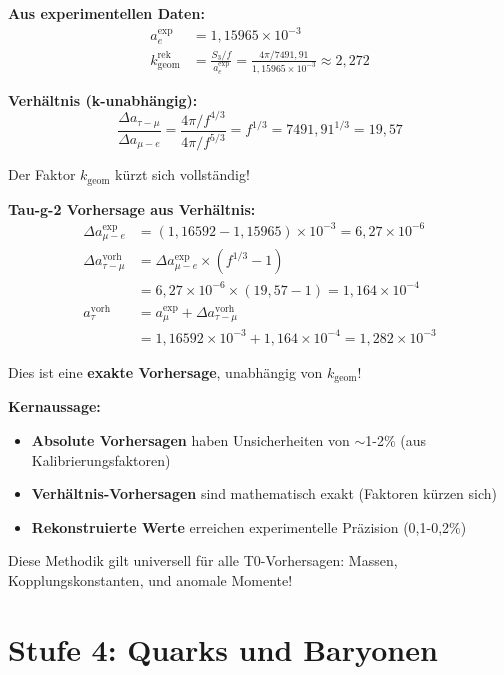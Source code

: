 	\textbf{Aus experimentellen Daten:}
	\begin{align}
		a_e^{\exp} &= 1{,}15965 \times 10^{-3} \\
		k_{\text{geom}}^{\text{rek}} &= \frac{S_3/f}{a_e^{\exp}} = \frac{4\pi/7491{,}91}{1{,}15965 \times 10^{-3}} \approx 2{,}272
	\end{align}
	
	\textbf{Verhältnis (k-unabhängig):}
	\begin{equation}
		\boxed{\frac{\Delta a_{\tau-\mu}}{\Delta a_{\mu-e}} = \frac{4\pi/f^{4/3}}{4\pi/f^{5/3}} = f^{1/3} = 7491{,}91^{1/3} = 19{,}57}
	\end{equation}
	
	Der Faktor \(k_{\text{geom}}\) kürzt sich vollständig!
	
	\textbf{Tau-g-2 Vorhersage aus Verhältnis:}
	\begin{align}
		\Delta a_{\mu-e}^{\exp} &= (1{,}16592 - 1{,}15965) \times 10^{-3} = 6{,}27 \times 10^{-6} \\
		\Delta a_{\tau-\mu}^{\text{vorh}} &= \Delta a_{\mu-e}^{\exp} \times (f^{1/3} - 1) \\
		&= 6{,}27 \times 10^{-6} \times (19{,}57 - 1) = 1{,}164 \times 10^{-4} \\
		a_\tau^{\text{vorh}} &= a_\mu^{\exp} + \Delta a_{\tau-\mu}^{\text{vorh}} \\
		&= 1{,}16592 \times 10^{-3} + 1{,}164 \times 10^{-4} = 1{,}282 \times 10^{-3}
	\end{align}
	
	Dies ist eine \textbf{exakte Vorhersage}, unabhängig von \(k_{\text{geom}}\)!
	
	\textbf{Kernaussage:}
	
	\begin{itemize}
		\item \textbf{Absolute Vorhersagen} haben Unsicherheiten von \(\sim\)1-2\% (aus Kalibrierungsfaktoren)
		\item \textbf{Verhältnis-Vorhersagen} sind mathematisch exakt (Faktoren kürzen sich)
		\item \textbf{Rekonstruierte Werte} erreichen experimentelle Präzision (0{,}1-0{,}2\%)
	\end{itemize}
	
	Diese Methodik gilt universell für alle T0-Vorhersagen: Massen, Kopplungskonstanten, und anomale Momente!
	
	\section{Stufe 4: Quarks und Baryonen}
	
